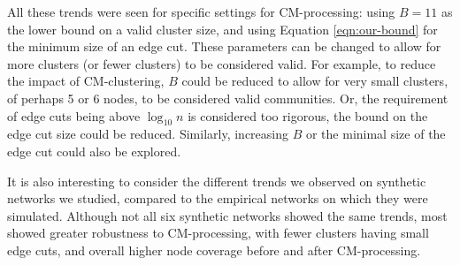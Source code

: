 \documentclass[11pt]{article}   	%
\begin{document}
All these trends were seen for specific settings for CM-processing: using $B=11$ as the lower bound on a valid cluster size, and using Equation \ref{eqn:our-bound} for the minimum size of an edge cut.
These parameters can be changed to allow for more clusters (or fewer clusters) to be considered valid.
For example, to reduce the impact of CM-clustering,  $B$ could be reduced to allow for very small clusters, of perhaps 5 or 6 nodes, to be considered valid communities. 
Or, the requirement of edge cuts being above $\log_{10}n$ is considered too rigorous, the bound on the edge cut size could be reduced.  
Similarly, increasing $B$ or the minimal size of the edge cut could also be explored. 
 

It is also interesting to consider the different trends we observed on synthetic networks we studied, compared to the empirical networks on which they were simulated.
Although not all six synthetic networks showed the same trends, most showed greater robustness to CM-processing, with fewer clusters having small edge cuts, and overall higher node coverage before and after CM-processing.
\end{document}
